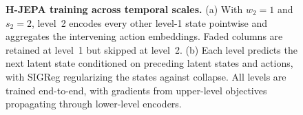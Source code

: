 \begin{figure}[t]
{%
}%
\caption{\textbf{H-JEPA training across temporal scales.}
(a) With $w_2{=}1$ and $s_2{=}2$, level~2 encodes every other level-1 state
pointwise and aggregates the intervening action embeddings.
Faded columns are retained at level~1 but skipped at level~2.
(b) Each level predicts the next latent state conditioned on preceding latent
states and actions,
with SIGReg regularizing the states against collapse.
All levels are trained end-to-end,
with gradients from upper-level objectives propagating through lower-level encoders.}
\label{fig:hjepa_training}
\end{figure}
